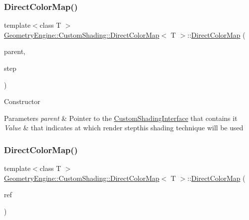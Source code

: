 \subsubsection{\texorpdfstring{DirectColorMap()}{DirectColorMap()}\hspace{0.1cm}{\footnotesize\ttfamily [1/2]}}
{\footnotesize\ttfamily template$<$class T $>$ \\
\mbox{\hyperlink{class_geometry_engine_1_1_custom_shading_1_1_direct_color_map}{Geometry\+Engine\+::\+Custom\+Shading\+::\+Direct\+Color\+Map}}$<$ T $>$\+::\mbox{\hyperlink{class_geometry_engine_1_1_custom_shading_1_1_direct_color_map}{Direct\+Color\+Map}} (\begin{DoxyParamCaption}\item[{\mbox{\hyperlink{class_geometry_engine_1_1_custom_shading_1_1_custom_shading_interface}{Custom\+Shading\+Interface}} $\ast$}]{parent,  }\item[{\mbox{\hyperlink{namespace_geometry_engine_1_1_custom_shading_a2dc236a5b567da5099069ce2b2be5609}{Custom\+Shading\+Steps}}}]{step }\end{DoxyParamCaption})\hspace{0.3cm}{\ttfamily [inline]}}

Constructor 
\begin{DoxyParams}{Parameters}
{\em parent} & Pointer to the \mbox{\hyperlink{class_geometry_engine_1_1_custom_shading_1_1_custom_shading_interface}{Custom\+Shading\+Interface}} that contains it \\
\hline
{\em Value} & that indicates at which render stepthis shading technique will be used \\
\hline
\end{DoxyParams}
\mbox{\label{class_geometry_engine_1_1_custom_shading_1_1_direct_color_map_a3d5033ee5a9ab64ebed320a28735cac7}} 
\subsubsection{\texorpdfstring{DirectColorMap()}{DirectColorMap()}\hspace{0.1cm}{\footnotesize\ttfamily [2/2]}}
{\footnotesize\ttfamily template$<$class T $>$ \\
\mbox{\hyperlink{class_geometry_engine_1_1_custom_shading_1_1_direct_color_map}{Geometry\+Engine\+::\+Custom\+Shading\+::\+Direct\+Color\+Map}}$<$ T $>$\+::\mbox{\hyperlink{class_geometry_engine_1_1_custom_shading_1_1_direct_color_map}{Direct\+Color\+Map}} (\begin{DoxyParamCaption}\item[{const \mbox{\hyperlink{class_geometry_engine_1_1_custom_shading_1_1_custom_shading_step}{Custom\+Shading\+Step}} \&}]{ref }\end{DoxyParamCaption})\hspace{0.3cm}{\ttfamily [inline]}}

